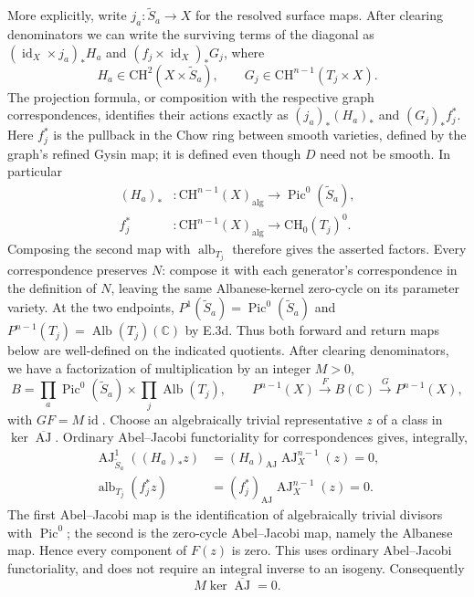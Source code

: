 More explicitly, write $j_a:\widetilde S_a\to X$ for the
resolved surface maps. After clearing denominators we can
write the surviving terms of the diagonal as
$(\operatorname{id}_X\times j_a)_*H_a$ and
$(f_j\times\operatorname{id}_X)_*G_j$, where
\[
 H_a\in\mathrm{CH}^2(X\times\widetilde S_a),\qquad
 G_j\in\mathrm{CH}^{n-1}(T_j\times X).
\]
The projection formula, or composition with the respective
graph correspondences, identifies their actions exactly as
$(j_a)_*(H_a)_*$ and $(G_j)_*f_j^*$. Here $f_j^*$ is the
pullback in the Chow ring between smooth varieties, defined
by the graph's refined Gysin map; it is defined even though
$D$ need not be smooth. In particular
\[
\begin{aligned}
 (H_a)_*&: \mathrm{CH}^{n-1}(X)_{\mathrm{alg}}
                \longrightarrow\operatorname{Pic}^0(\widetilde S_a),\\
 f_j^*&: \mathrm{CH}^{n-1}(X)_{\mathrm{alg}}
                \longrightarrow\mathrm{CH}_0(T_j)^0.
\end{aligned}
\]
Composing the second map with $\operatorname{alb}_{T_j}$
therefore gives the asserted factors. Every correspondence
preserves $N$: compose it with each generator's correspondence
in the definition of $N$, leaving the same Albanese-kernel
zero-cycle on its parameter variety. At the two endpoints,
$P^1(\widetilde S_a)=\operatorname{Pic}^0(\widetilde S_a)$ and
$P^{n-1}(T_j)=\operatorname{Alb}(T_j)(\mathbb C)$ by E.3d.
Thus both forward and return maps below are well-defined on
the indicated quotients. After clearing denominators,
we have a factorization of multiplication by an integer $M>0$,
\[
 B=\prod_a\operatorname{Pic}^0(\widetilde S_a)
       \times\prod_j\operatorname{Alb}(T_j),
 \qquad
 P^{n-1}(X)\xrightarrow{F}B(\mathbb C)
 \xrightarrow{G}P^{n-1}(X),
\]
with $GF=M\operatorname{id}$.
Choose an algebraically trivial representative $z$ of a class
in $\ker\overline{\operatorname{AJ}}$. Ordinary Abel--Jacobi
functoriality for correspondences gives, integrally,
\[
\begin{aligned}
 \operatorname{AJ}^1_{\widetilde S_a}((H_a)_*z)
       &=(H_a)_{\operatorname{AJ}}\operatorname{AJ}^{n-1}_X(z)=0,\\
 \operatorname{alb}_{T_j}(f_j^*z)
       &=(f_j^*)_{\operatorname{AJ}}\operatorname{AJ}^{n-1}_X(z)=0.
\end{aligned}
\]
The first Abel--Jacobi map is the identification of
algebraically trivial divisors with $\operatorname{Pic}^0$;
the second is the zero-cycle Abel--Jacobi map, namely the
Albanese map. Hence every component of $F(z)$ is zero.
This uses ordinary Abel--Jacobi functoriality, and does not
require an integral inverse to an isogeny. Consequently
\begin{equation}\label{eq:E3-bounded-AJ-kernel}
             M\ker\overline{\operatorname{AJ}}=0.
\end{equation}

